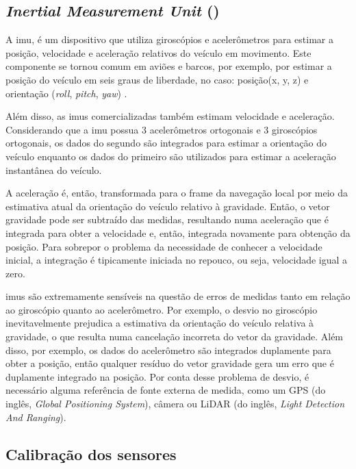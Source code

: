 \documentclass[acronym, symbols, table]{fei}
\begin{document}
			\subsection{\textit{Inertial Measurement Unit} ()}
			
				A \acrshort{imu}, é um dispositivo que utiliza giroscópios e acelerômetros para estimar a posição, velocidade e aceleração relativos do veículo em movimento. Este componente se tornou comum em aviões e barcos, por exemplo, por estimar a posição do veículo em seis graus de liberdade, no caso: posição(x, y, z) e orientação (\textit{roll}, \textit{pitch}, \textit{yaw}) \cite{siegwart2011introduction}.
				
				Além disso, as \acrshort{imu}s comercializadas também estimam velocidade e aceleração. Considerando que a \acrshort{imu} possua 3 acelerômetros ortogonais e 3 giroscópios ortogonais, os dados do segundo são integrados para estimar a orientação do veículo enquanto os dados do primeiro são utilizados para estimar a aceleração instantânea do veículo.
				
				A aceleração é, então, transformada para o frame da navegação local por meio da estimativa atual da orientação do veículo relativo à gravidade. Então, o vetor gravidade pode ser subtraído das medidas, resultando numa aceleração que é integrada para obter a velocidade e, então, integrada novamente para obtenção da posição. Para sobrepor o problema da necessidade de conhecer a velocidade inicial, a integração é tipicamente iniciada no repouco, ou seja, velocidade igual a zero.
				
				\acrshort{imu}s são extremamente sensíveis na questão de erros de medidas tanto em relação ao giroscópio quanto ao acelerômetro. Por exemplo, o desvio no giroscópio inevitavelmente prejudica a estimativa da orientação do veículo relativa à gravidade, o que resulta numa cancelação incorreta do vetor da gravidade. Além disso, por exemplo, os dados do acelerômetro são integrados duplamente para obter a posição, então qualquer resíduo do vetor gravidade gera um erro que é duplamente integrado na posição. Por conta desse problema de desvio, é necessário alguma referência de fonte externa de medida, como um GPS (do inglês, \textit{Global Positioning System}), câmera ou LiDAR (do inglês, \textit{Light Detection And Ranging}).
		
		\subsection{Calibração dos sensores}\label{sec:calibracao_sensores}
		
\end{document}
